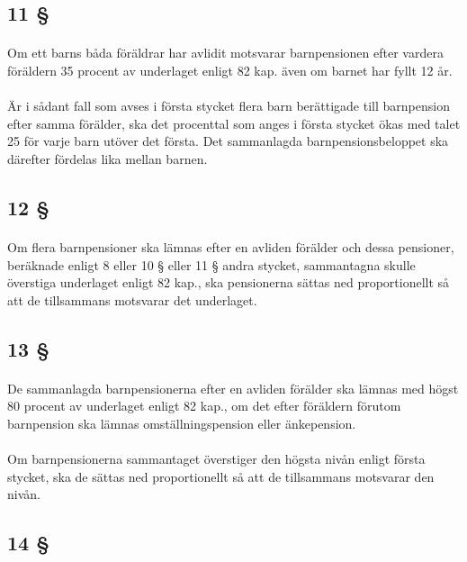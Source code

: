 \documentclass[a4paper,notitlepage,openany,10pt]{book}
\begin{document}
\subsection*{11 §}
\paragraph*{}
Om ett barns båda föräldrar har avlidit motsvarar barnpensionen efter vardera föräldern 35 procent av underlaget enligt 82 kap. även om barnet har fyllt 12 år.
\paragraph*{}
Är i sådant fall som avses i första stycket flera barn berättigade till barnpension efter samma förälder, ska det procenttal som anges i första stycket ökas med talet 25 för varje barn utöver det första. Det sammanlagda barnpensionsbeloppet ska därefter fördelas lika mellan barnen.
\subsection*{12 §}
\paragraph*{}
Om flera barnpensioner ska lämnas efter en avliden förälder och dessa pensioner, beräknade enligt 8 eller 10 § eller 11 § andra stycket, sammantagna skulle överstiga underlaget enligt 82 kap., ska pensionerna sättas ned proportionellt så att de tillsammans motsvarar det underlaget.
\subsection*{13 §}
\paragraph*{}
De sammanlagda barnpensionerna efter en avliden förälder ska lämnas med högst 80 procent av underlaget enligt 82 kap., om det efter föräldern förutom barnpension ska lämnas omställningspension eller änkepension.
\paragraph*{}
Om barnpensionerna sammantaget överstiger den högsta nivån enligt första stycket, ska de sättas ned proportionellt så att de tillsammans motsvarar den nivån.
\subsection*{14 §}
\end{document}
